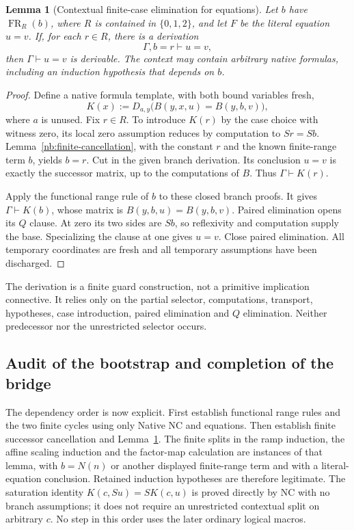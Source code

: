 \documentclass[11pt,letterpaper]{article}
\newtheorem{lemma}[theorem]{Lemma}
\theoremstyle{definition}\newtheorem{definition}[theorem]{Definition}
\theoremstyle{remark}\newtheorem{remark}[theorem]{Remark}
\begin{document}
\begin{lemma}[Contextual finite-case elimination for equations]
\label{nb:guarded-cases}
Let $b$ have $\operatorname{FR}_R(b)$, where $R$ is contained in
$\{0,1,2\}$, and let $F$ be the literal equation $u=v$.
If, for each $r\in R$, there is a derivation
\[
                         \Gamma,b=r\vdash u=v,
\]
then $\Gamma\vdash u=v$ is derivable.  The context may contain arbitrary
native formulas, including an induction hypothesis that depends on $b$.
\end{lemma}
\begin{proof}
Define a native formula template, with both bound variables fresh,
\[
 K(x):=D_{a,y}\bigl(B(y,x,u)=B(y,b,v)\bigr),
\]
where $a$ is unused.  Fix $r\in R$.  To introduce $K(r)$ by the case
choice with witness zero, its local zero assumption reduces by
computation to $Sr=Sb$.  Lemma~\ref{nb:finite-cancellation}, with the
constant $r$ and the known finite-range term $b$, yields $b=r$.
Cut in the given branch derivation.  Its conclusion $u=v$ is exactly
the successor matrix, up to the computations of $B$.  Thus
$\Gamma\vdash K(r)$.

Apply the functional range rule of $b$ to these closed branch proofs.
It gives $\Gamma\vdash K(b)$, whose matrix is
$B(y,b,u)=B(y,b,v)$.  Paired elimination opens its $Q$ clause.
At zero its two sides are $Sb$, so reflexivity and computation supply
the base.  Specializing the clause at one gives $u=v$.  Close paired
elimination.  All temporary coordinates are fresh and all temporary
assumptions have been discharged.
\end{proof}

The derivation is a finite guard construction, not a primitive implication
connective.  It relies only on the partial selector, computations,
transport, hypotheses, case introduction, paired elimination and $Q$
elimination.  Neither predecessor nor the unrestricted selector occurs.

\subsection{Audit of the bootstrap and completion of the bridge}

The dependency order is now explicit.  First establish functional range
rules and the two finite cycles using only Native NC and equations.
Then establish finite successor cancellation and
Lemma~\ref{nb:guarded-cases}.  The finite splits in the ramp induction,
the affine scaling induction and the factor-map calculation are instances
of that lemma, with $b=N(n)$ or another displayed finite-range term and
with a literal-equation conclusion.  Retained induction hypotheses are
therefore legitimate.  The saturation identity $K(c,Su)=S K(c,u)$ is
proved directly by NC with no branch assumptions; it does not require
an unrestricted contextual split on arbitrary $c$.  No step in this order
uses the later ordinary logical macros.
\end{document}
